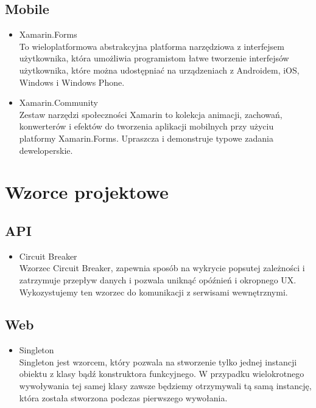 \documentclass{article}
\begin{document}
    \subsection{Mobile}
     \begin{itemize}
            \item Xamarin.Forms\\
             To wieloplatformowa abstrakcyjna platforma narzędziowa z interfejsem użytkownika, która umożliwia programistom łatwe tworzenie interfejsów użytkownika, które można udostępniać na urządzeniach z Androidem, iOS, Windows i Windows Phone.
            \item Xamarin.Community\\
            Zestaw narzędzi społeczności Xamarin to kolekcja animacji, zachowań, konwerterów i efektów do tworzenia aplikacji mobilnych przy użyciu platformy Xamarin.Forms. Upraszcza i demonstruje typowe zadania deweloperskie.
             \end{itemize}


\section{Wzorce projektowe}
    \subsection{API}
       \begin{itemize}
           \item Circuit Breaker\\
             Wzorzec Circuit Breaker, zapewnia sposób na wykrycie popsutej zależności i zatrzymuje przepływ danych i pozwala uniknąć opóźnień i okropnego UX.
Wykozystujemy ten wzorzec do komunikacji z serwisami wewnętrznymi.
            \end{itemize}   
    \subsection{Web}
  \begin{itemize}
           \item Singleton\\
             Singleton jest wzorcem, który pozwala na stworzenie tylko jednej instancji obiektu z klasy bądź konstruktora funkcyjnego.  W przypadku wielokrotnego wywoływania tej samej klasy zawsze będziemy otrzymywali tą samą instancję, która została stworzona podczas pierwszego wywołania. 
            \end{itemize}     
\end{document}

